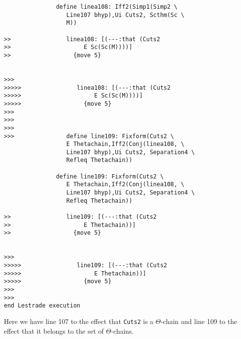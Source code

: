 \documentclass[12pt]{article}
\begin{document}
\begin{verbatim}
               define linea108: Iff2(Simp1(Simp2 \
                  Line107 bhyp),Ui Cuts2, Scthm(Sc \
                  M))

>>                linea108: [(---:that (Cuts2
>>                     E Sc(Sc(M))))]
>>                  {move 5}


>>>
>>>>>                linea108: [(---:that (Cuts2
>>>>>                     E Sc(Sc(M))))]
>>>>>                  {move 5}
>>>
>>>
>>>
>>>               define line109: Fixform(Cuts2 \
                  E Thetachain,Iff2(Conj(linea108, \
                  Line107 bhyp),Ui Cuts2, Separation4 \
                  Refleq Thetachain))

               define line109: Fixform(Cuts2 \
                  E Thetachain,Iff2(Conj(linea108, \
                  Line107 bhyp),Ui Cuts2, Separation4 \
                  Refleq Thetachain))

>>                line109: [(---:that (Cuts2
>>                     E Thetachain))]
>>                  {move 5}


>>>
>>>>>                line109: [(---:that (Cuts2
>>>>>                     E Thetachain))]
>>>>>                  {move 5}
>>>
>>>
end Lestrade execution
\end{verbatim}

Here we have line 107 to the effect that {\tt Cuts2} is a $\Theta$-chain and line 109 to the effect that it belongs to the set of $\Theta$-chains.
\end{document}
